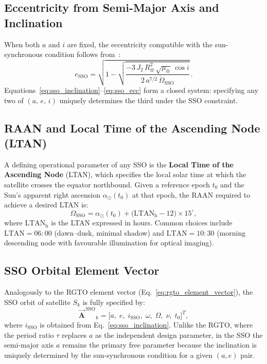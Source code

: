 \subsection{Eccentricity from Semi-Major Axis and Inclination}
\label{sec:sso_ecc}

When both $a$ and $i$ are fixed, the eccentricity compatible with the sun-synchronous condition follows from~\cite[Eq.~11-16]{valladoFundamentalsAstrodynamicsApplications2001}:
\begin{equation}
    e_{\mathrm{SSO}} = \sqrt{1 - \sqrt{\frac{-3\,J_2\,R_{\oplus}^2\,\sqrt{\mu_{\oplus}}\,\cos i}{2\,a^{7/2}\,\dot{\Omega}_{\mathrm{SSO}}}}}\,.
    \label{eq:sso_ecc}
\end{equation}
Equations~\eqref{eq:sso_inclination}--\eqref{eq:sso_ecc} form a closed system: specifying any two of $(a,\,e,\,i)$ uniquely determines the third under the SSO constraint.

\subsection{RAAN and Local Time of the Ascending Node (LTAN)}
\label{sec:sso_ltan}

A defining operational parameter of any SSO is the \textbf{Local Time of the Ascending Node} (LTAN), which specifies the local solar time at which the satellite crosses the equator northbound.  Given a reference epoch $t_0$ and the Sun's apparent right ascension $\alpha_{\odot}(t_0)$ at that epoch, the RAAN required to achieve a desired LTAN is:
\begin{equation}
    \Omega_{\mathrm{SSO}} = \alpha_{\odot}(t_0) + \bigl(\mathrm{LTAN}_{\mathrm{h}} - 12\bigr) \times 15^{\circ},
    \label{eq:sso_raan_ltan}
\end{equation}
where $\mathrm{LTAN}_{\mathrm{h}}$ is the LTAN expressed in hours.  Common choices include $\mathrm{LTAN} = 06\!:\!00$ (dawn--dusk, minimal shadow) and $\mathrm{LTAN} = 10\!:\!30$ (morning descending node with favourable illumination for optical imaging).

\subsection{SSO Orbital Element Vector}
\label{sec:sso_element_vector}

Analogously to the RGTO element vector (Eq.~\eqref{eq:rgto_element_vector}), the SSO orbit of satellite $S_k$ is fully specified by:
\begin{equation}
    \vec{\mathbf{A}}^{\,\mathrm{SSO}}{}_{k} = \bigl[a,\; e,\; i_{\mathrm{SSO}},\; \omega,\; \Omega,\; \nu,\; t_0\bigr]^{T},
    \label{eq:sso_element_vector}
\end{equation}
where $i_{\mathrm{SSO}}$ is obtained from Eq.~\eqref{eq:sso_inclination}.  Unlike the RGTO, where the period ratio $\tau$ replaces $a$ as the independent design parameter, in the SSO the semi-major axis $a$ remains the primary free parameter because the inclination is uniquely determined by the sun-synchronous condition for a given $(a, e)$ pair.


